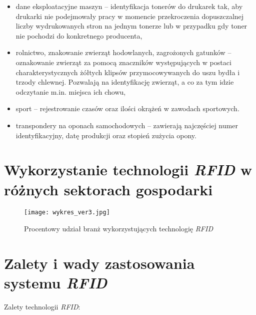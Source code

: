 \begin{itemize}
	\item dane eksploatacyjne maszyn – identyfikacja tonerów do drukarek tak, aby drukarki nie podejmowały pracy w momencie przekroczenia dopuszczalnej liczby wydrukowanych stron na jednym tonerze lub w przypadku gdy toner nie pochodzi do konkretnego producenta, 
	
	\item rolnictwo, znakowanie zwierząt hodowlanych, zagrożonych gatunków – oznakowanie zwierząt za pomocą znaczników występujących w postaci charakterystycznych żółtych klipsów przymocowywanych do uszu bydła i trzody chlewnej. Pozwalają na identyfikację zwierząt, a co za tym idzie odczytanie m.in. miejsca ich chowu,
	
	\item sport – rejestrowanie czasów oraz ilości okrążeń w zawodach sportowych. 
	
	\item transpondery na oponach samochodowych – zawierają najczęściej numer identyfikacyjny, datę produkcji oraz stopień zużycia opony.

\end{itemize}


\section{Wykorzystanie technologii \emph{RFID} w różnych sektorach gospodarki}

	\begin{figure}[h!]
	\centering
	    \texttt{[image: wykres\_ver3.jpg]}
	    \caption{Procentowy udział branż wykorzystujących technologię \emph{RFID}}
	\end{figure}


\section {Zalety i wady zastosowania systemu \emph{RFID}}

\noindent 
Zalety technologii \emph{RFID}:

